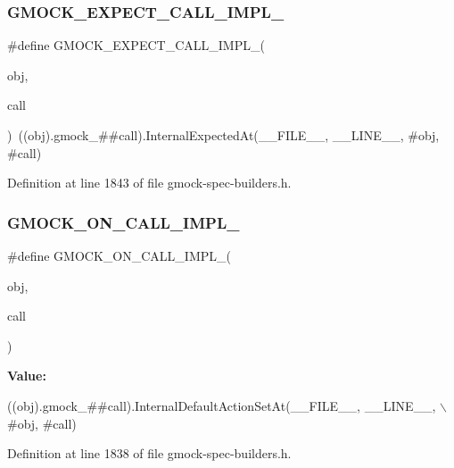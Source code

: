 \subsubsection{\texorpdfstring{G\+M\+O\+C\+K\+\_\+\+E\+X\+P\+E\+C\+T\+\_\+\+C\+A\+L\+L\+\_\+\+I\+M\+P\+L\+\_\+}{GMOCK\_EXPECT\_CALL\_IMPL\_}}
{\footnotesize\ttfamily \#define G\+M\+O\+C\+K\+\_\+\+E\+X\+P\+E\+C\+T\+\_\+\+C\+A\+L\+L\+\_\+\+I\+M\+P\+L\+\_\+(\begin{DoxyParamCaption}\item[{}]{obj,  }\item[{}]{call }\end{DoxyParamCaption})~((obj).gmock\+\_\+\#\#call).Internal\+Expected\+At(\+\_\+\+\_\+\+F\+I\+L\+E\+\_\+\+\_\+, \+\_\+\+\_\+\+L\+I\+N\+E\+\_\+\+\_\+, \#obj, \#call)}



Definition at line 1843 of file gmock-\/spec-\/builders.\+h.

\mbox{\label{gmock-spec-builders_8h_a7c47d936dcf489ac84c046740aea777e}} 
\subsubsection{\texorpdfstring{G\+M\+O\+C\+K\+\_\+\+O\+N\+\_\+\+C\+A\+L\+L\+\_\+\+I\+M\+P\+L\+\_\+}{GMOCK\_ON\_CALL\_IMPL\_}}
{\footnotesize\ttfamily \#define G\+M\+O\+C\+K\+\_\+\+O\+N\+\_\+\+C\+A\+L\+L\+\_\+\+I\+M\+P\+L\+\_\+(\begin{DoxyParamCaption}\item[{}]{obj,  }\item[{}]{call }\end{DoxyParamCaption})}

{\bfseries Value\+:}
\begin{DoxyCode}
((obj).gmock\_##call).InternalDefaultActionSetAt(\_\_FILE\_\_, \_\_LINE\_\_, \(\backslash\)
                                                    #obj, #call)
\end{DoxyCode}


Definition at line 1838 of file gmock-\/spec-\/builders.\+h.


